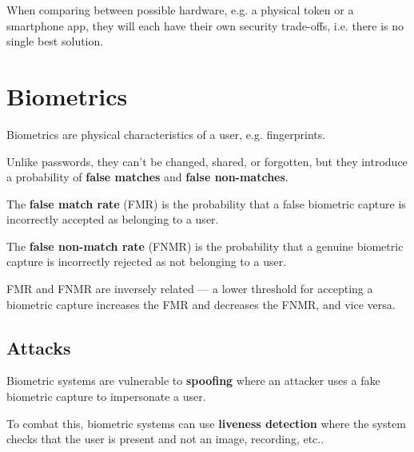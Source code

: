 When comparing between possible hardware, e.g. a physical token or a smartphone app, they will each have their own security trade-offs, i.e. there is no single best solution.

\section{Biometrics}
Biometrics are physical characteristics of a user, e.g. fingerprints.

Unlike passwords, they can't be changed, shared, or forgotten, but they introduce a probability of \textbf{false matches} and \textbf{false non-matches}.

The \textbf{false match rate} (FMR) is the probability that a false biometric capture is incorrectly accepted as belonging to a user.

The \textbf{false non-match rate} (FNMR) is the probability that a genuine biometric capture is incorrectly rejected as not belonging to a user.

FMR and FNMR are inversely related --- a lower threshold for accepting a biometric capture increases the FMR and decreases the FNMR, and vice versa.

\subsection{Attacks}
Biometric systems are vulnerable to \textbf{spoofing} where an attacker uses a fake biometric capture to impersonate a user.

To combat this, biometric systems can use \textbf{liveness detection} where the system checks that the user is present and not an image, recording, etc..